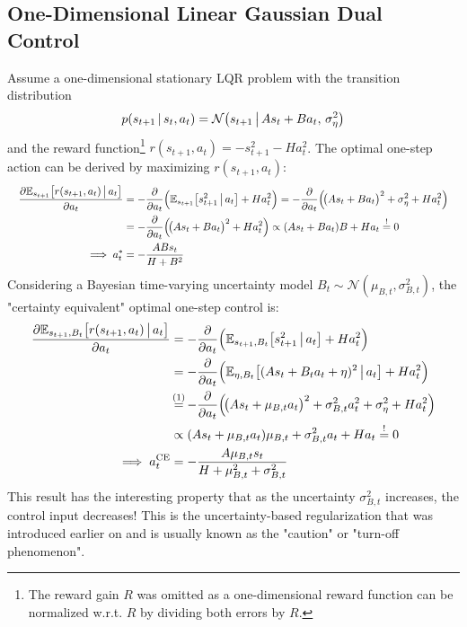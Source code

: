 		\subsection{One-Dimensional Linear Gaussian Dual Control}
			Assume a one-dimensional stationary LQR problem with the transition distribution
			\begin{equation*}
				p(s_{t + 1} \,\vert\, s_t, a_t) = \mathcal{N}\big( s_{t + 1} \,\big\vert\, A s_t + B a_t,\, \sigma_\eta^2 \big)
			\end{equation*}
			and the reward function\footnote{The reward gain \(R\) was omitted as a one-dimensional reward function can be normalized w.r.t. \(R\) by dividing both errors by \(R\).} \( r(s_{t + 1}, a_t) = -s_{t + 1}^2 - H a_t^2 \). The optimal one-step action can be derived by maximizing \( r(s_{t + 1}, a_t) \):
			\begin{align*}
				&& \pdv{\mathbb{E}_{s_{t + 1}}\big[ r(s_{t + 1}, a_t) \,\big\vert\,a_t \big]}{a_t}
					&= -\pdv{a_t} \Big( \mathbb{E}_{s_{t + 1}}\big[ s_{t + 1}^2 \,\big\vert\, a_t \big] + H a_t^2 \Big)
					= -\pdv{a_t} \Big(\! \big( A s_t + B a_t \big)^2 + \sigma_\eta^2 + H a_t^2 \Big) & \\
					&&&= -\pdv{a_t} \Big(\! \big( A s_t + B a_t \big)^2 + H a_t^2 \Big)
					\propto (A s_t + B a_t) B + H a_t \overset{!}{=} 0 & \\
				&&\implies a_t^\ast &= -\frac{A B s_t}{H + B^2} &
			\end{align*}
			Considering a Bayesian time-varying uncertainty model \( B_t \sim \mathcal{N}(\mu_{B, t}, \sigma_{B, t}^2) \), the "certainty equivalent" optimal one-step control is:
			\begin{align*}
				&& \pdv{\E_{s_{t + 1}, B_t}\big[ r(s_{t + 1}, a_t) \biggiven a_t \big]}{a_t}
					&= -\pdv{a_t} \Big( \E_{s_{t + 1}, B_t}\big[ s_{t + 1}^2 \biggiven a_t \big] + H a_t^2 \Big) & \\
					&&&= -\pdv{a_t} \Big( \E_{\eta, B_t}\big[ (A s_t + B_t a_t + \eta)^2 \biggiven a_t \big] + H a_t^2 \Big) & \\
					&&&\oversetfootnotemark{=} -\pdv{a_t} \Big(\! \big( A s_t + \mu_{B, t} a_t \big)^2 + \sigma_{B, t}^2 a_t^2 + \sigma_\eta^2 + H a_t^2 \Big) & \\
					&&&\propto (A s_t + \mu_{B, t} a_t) \mu_{B, t} + \sigma_{B, t}^2 a_t + H a_t \overset{!}{=} 0 & \\
				&&\implies a_t^\mathrm{CE} &= -\frac{A \mu_{B, t} s_t}{H + \mu_{B, t}^2 + \sigma_{B, t}^2}
			\end{align*}
			This result has the interesting property that as the uncertainty \( \sigma_{B, t}^2 \) increases, the control input decreases! This is the uncertainty-based regularization that was introduced earlier on and is usually known as the "caution" or "turn-off phenomenon".
